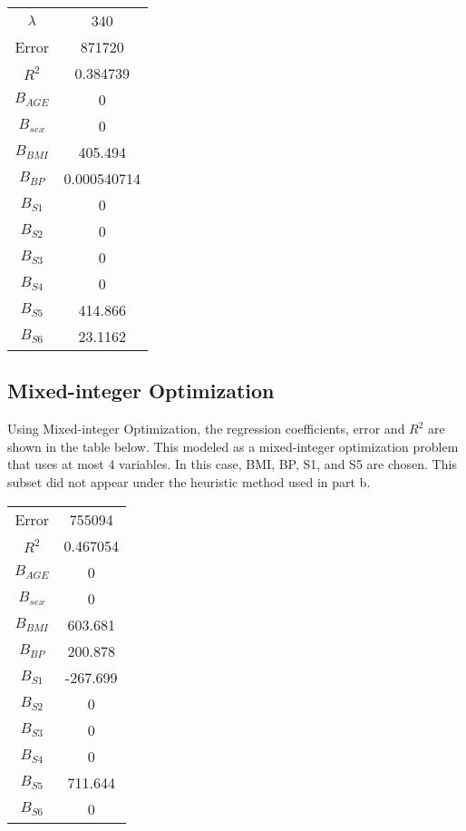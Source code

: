 \documentclass[15pt,a4paper,openright]{article}
\begin{document}
\begin{center}
 \begin{tabular}{||c | c||} 
 \hline
 $\lambda$ & 340 \\ 
 Error &  871720 \\
 $R^2$ & 0.384739 \\
 $B_{AGE}$ & 0 \\
 $B_{sex}$ & 0 \\
 $B_{BMI}$ & 405.494 \\
 $B_{BP}$ & 0.000540714 \\
 $B_{S1}$ & 0 \\
 $B_{S2}$ & 0 \\
 $B_{S3}$ & 0 \\
 $B_{S4}$ & 0 \\
 $B_{S5}$ & 414.866 \\
 $B_{S6}$ & 23.1162 \\ 
[1ex] 
\hline
\end{tabular}
\end{center}


\subsection{Mixed-integer Optimization}

Using Mixed-integer Optimization, the regression coefficients, error and $R^2$ are shown in the table below. This modeled as a mixed-integer optimization problem that uses at most 4 variables. In this case, BMI, BP, S1, and S5 are chosen. This subset did not appear under the heuristic method used in part b. 

\begin{center}
 \begin{tabular}{||c | c||} 
 \hline
 Error &  755094 \\ 
 $R^2$ & 0.467054 \\
 $B_{AGE}$ & 0 \\
 $B_{sex}$ & 0 \\
 $B_{BMI}$ & 603.681 \\
 $B_{BP}$ & 200.878 \\
 $B_{S1}$ & -267.699\\
 $B_{S2}$ & 0 \\
 $B_{S3}$ & 0 \\
 $B_{S4}$ & 0 \\
 $B_{S5}$ & 711.644 \\
 $B_{S6}$ & 0 \\ 
[1ex] 
\hline
\end{tabular}
\end{center}
\end{document}
